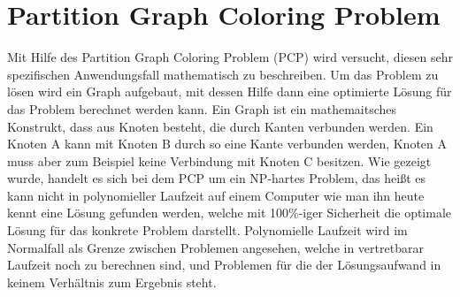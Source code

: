 \section{Partition Graph Coloring Problem}
Mit Hilfe des Partition Graph Coloring Problem (PCP) wird versucht, diesen sehr spezifischen Anwendungsfall mathematisch zu beschreiben. Um das Problem zu lösen wird
ein Graph aufgebaut, mit dessen Hilfe dann eine optimierte Lösung für das Problem berechnet werden kann. Ein Graph ist ein mathemaitsches Konstrukt, dass aus Knoten
besteht, die durch Kanten verbunden werden. Ein Knoten A kann mit Knoten B durch so eine Kante verbunden werden, Knoten A muss aber zum Beispiel keine Verbindung mit
Knoten C besitzen. Wie gezeigt wurde, handelt es sich bei dem PCP um ein NP-hartes Problem, das heißt es kann nicht in polynomieller Laufzeit auf einem Computer
wie man ihn heute kennt eine Lösung gefunden werden, welche mit 100\%-iger Sicherheit die optimale Lösung für das konkrete Problem darstellt. Polynomielle Laufzeit
wird im Normalfall als Grenze zwischen Problemen angesehen, welche in vertretbarar Laufzeit noch zu berechnen sind, und Problemen für die der Lösungsaufwand in
keinem Verhältnis zum Ergebnis steht.

